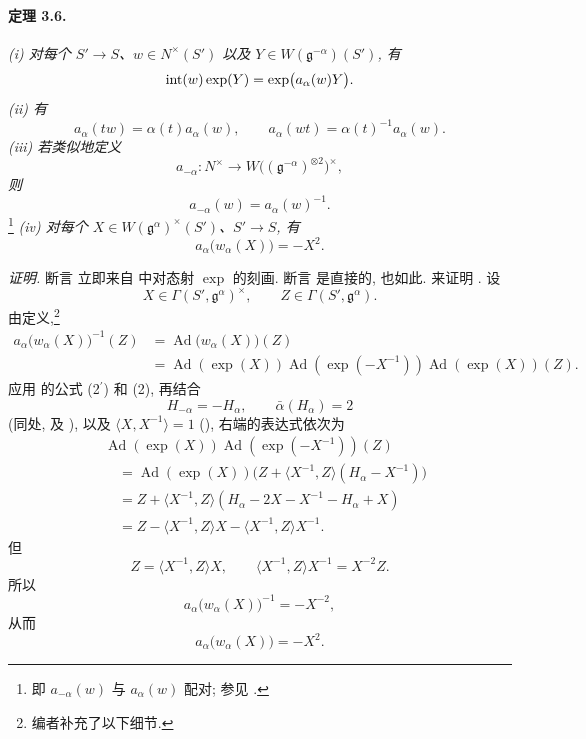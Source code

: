 \paragraph{\textbf{定理 3.6.}}
\emph{\textup{(i)} 对每个 \(S'\to S\)、\(w\in N^\times(S')\) 以及 \(Y\in W(\mathfrak g^{-\alpha})(S')\), 有}
\[
  \operatorname{int}(w)\exp(Y)=\exp\bigl(a_\alpha(w)Y\bigr).
\]
\smallskip
\noindent\emph{\textup{(ii)} 有}
\[
  a_\alpha(tw)=\alpha(t)a_\alpha(w),
  \qquad
  a_\alpha(wt)=\alpha(t)^{-1}a_\alpha(w).
\]
\smallskip
\noindent\emph{\textup{(iii)} 若类似地定义}
\[
  a_{-\alpha}\colon
  N^\times\longrightarrow
  W\bigl((\mathfrak g^{-\alpha})^{\otimes2}\bigr)^\times,
\]
\emph{则}
\[
  a_{-\alpha}(w)=a_\alpha(w)^{-1}.
\]
\footnote{即 \(a_{-\alpha}(w)\) 与 \(a_\alpha(w)\) 配对; 参见 .}
\smallskip
\noindent\emph{\textup{(iv)} 对每个 \(X\in W(\mathfrak g^\alpha)^\times(S')\)、\(S'\to S\), 有}
\[
  a_\alpha\bigl(w_\alpha(X)\bigr)=-X^2.
\]

\smallskip
\noindent\emph{证明.}
断言 \textup{} 立即来自  中对态射 \(\exp\) 的刻画. 断言 \textup{} 是直接的, \textup{} 也如此. 来证明 \textup{}. 设
\[
  X\in\Gamma(S',\mathfrak g^\alpha)^\times,
  \qquad
  Z\in\Gamma(S',\mathfrak g^\alpha).
\]
由定义,\footnote{编者补充了以下细节.}
\[
\begin{aligned}
  a_\alpha\bigl(w_\alpha(X)\bigr)^{-1}(Z)
    &={}\operatorname{Ad}\bigl(w_\alpha(X)\bigr)(Z)\\
    &={}\operatorname{Ad}(\exp(X))
       \operatorname{Ad}(\exp(-X^{-1}))
       \operatorname{Ad}(\exp(X))(Z).
\end{aligned}
\]
应用 的公式 \textup{(2\(^{\prime}\))} 和 \textup{(2)}, 再结合
\[
  H_{-\alpha}=-H_\alpha,
  \qquad
  \bar\alpha(H_\alpha)=2
\]
\textup{(同处, \textup{} 及 \textup{})}, 以及 \(\langle X,X^{-1}\rangle=1\) \textup{()}, 右端的表达式依次为
\[
\begin{aligned}
  &\operatorname{Ad}(\exp(X))
    \operatorname{Ad}(\exp(-X^{-1}))(Z)\\
  &\quad={}\operatorname{Ad}(\exp(X))
       \bigl(Z+\langle X^{-1},Z\rangle(H_\alpha-X^{-1})\bigr)\\
  &\quad={}Z+\langle X^{-1},Z\rangle
       (H_\alpha-2X-X^{-1}-H_\alpha+X)\\
  &\quad={}Z-\langle X^{-1},Z\rangle X
       -\langle X^{-1},Z\rangle X^{-1}.
\end{aligned}
\]
但
\[
  Z=\langle X^{-1},Z\rangle X,
  \qquad
  \langle X^{-1},Z\rangle X^{-1}=X^{-2}Z.
\]
所以
\[
  a_\alpha\bigl(w_\alpha(X)\bigr)^{-1}=-X^{-2},
\]
从而
\[
  a_\alpha\bigl(w_\alpha(X)\bigr)=-X^2.
\]

